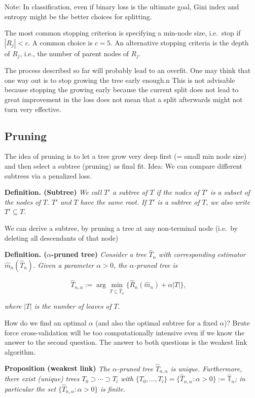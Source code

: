 \documentclass[
]{book}
\begin{document}
Note: In classification, even if binary loss is the ultimate goal, Gini index and entropy might be the better choices for splitting.

The most common stopping criterion is specifying a min-node size, i.e.~stop if \(|R_j|<c\). A common choice is \(c=5\). An alternative stopping criteria is the depth of \(R_j\), i.e., the number of parent nodes of \(R_j\).

The process described so far will probably lead to an overfit. One may think that one way out is to stop growing the tree early enough.n This is not advisable because stopping the growing early because the current split does not lead to great improvement in the loss does not mean that a split afterwards might not turn very effective.

\hypertarget{pruning}{%
\subsection{Pruning}\label{pruning}}

The idea of pruning is to let a tree grow very deep first (= small min node size) and then select a subtree (pruning) as final fit. Idea: We can compare different subtrees via a penalized loss.

\textbf{Definition. (Subtree)} \emph{We call \(T'\) a subtree of \(T\) if the nodes of \(T'\) is a subset of the nodes of \(T\). \(T'\) and \(T\) have the same root. If \(T'\) is a subtree of \(T\), we also write \(T'\subseteq T\).}

We can derive a subtree, by pruning a tree at any non-terminal node (i.e.~by deleting all descendants of that node)

\textbf{Definition. (\(\alpha\)-pruned tree)} \emph{Consider a tree \(\hat T_n\) with corresponding estimator \(\hat m_n(\hat T_n)\). Given a parameter \(\alpha>0\), the \(\alpha\)-pruned tree is}

\[
\hat T_{n,\alpha} := \arg \min_{T\subseteq \hat T_n}\{\hat R_n(\hat m_n) + \alpha |T|\},
\]

\emph{where \(|T|\) is the number of leaves of \(T\).}

How do we find an optimal \(\alpha\) (and also the optimal subtree for a fixed \(\alpha\))? Brute force cross-validation will be too computationally intensive even if we know the answer to the second question. The answer to both questions is the weakest link algorithm.

\textbf{Proposition (weakest link)} \emph{The \(\alpha\)-pruned tree \(\hat T_{n,\alpha}\) is unique. Furthermore, there exist (unique) trees \(T_0\supset \cdots\supset T_l\) with \(\{T_0,\dots, T_l\}=\{\hat T_{n,\alpha} : \alpha>0\}:=\hat{ \mathbb T}_n\); in particular the set \(\{\hat T_{n,\alpha} : \alpha>0\}\) is finite.}
\end{document}
